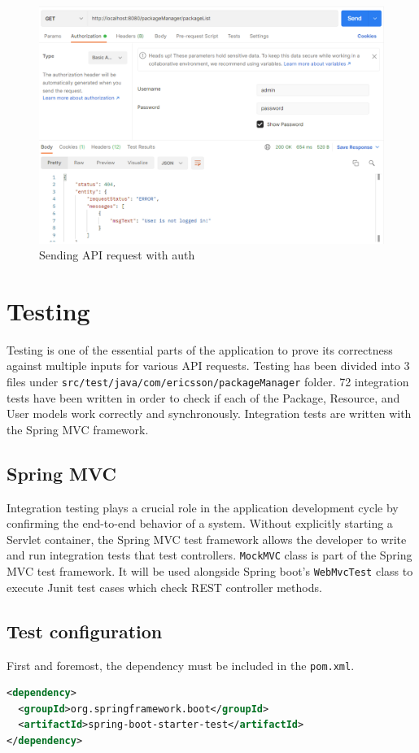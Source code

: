 \begin{figure}[H]
	\centering
	\includegraphics[width=\textwidth]{images/security-postman-2.png}
	\caption{Sending API request with auth}
	\label{ssec:send-api-with-auth}
\end{figure}


\section{Testing}
\label{sec:testing}

Testing is one of the essential parts of the application to prove its correctness against multiple inputs for various API requests. Testing has been divided into 3 files under \texttt{src/test/java/com/ericsson/packageManager} folder. 72 integration tests have been written in order to check if each of the Package, Resource, and User models work correctly and synchronously. Integration tests are written with the Spring MVC framework. 

\subsection{Spring MVC}
Integration testing plays a crucial role in the application development cycle by confirming the end-to-end behavior of a system. Without explicitly starting a Servlet container, the Spring MVC test framework allows the developer to write and run integration tests that test controllers. \texttt{MockMVC} class is part of the Spring MVC test framework. It will be used alongside Spring boot’s \texttt{WebMvcTest} class to execute Junit test cases which check REST controller methods.

\subsection{Test configuration}
First and foremost, the dependency must be included in the \texttt{pom.xml}.
\begin{lstlisting}[language={xml}]
<dependency>
  <groupId>org.springframework.boot</groupId>
  <artifactId>spring-boot-starter-test</artifactId>
</dependency>
\end{lstlisting}

